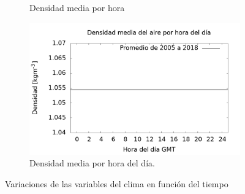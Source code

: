 \begin{figure}[H]
\begin{subfigure}[b]{0.49\textwidth}
			\caption{Densidad media por hora}
			\label{fig:densidad_hora}
		\end{subfigure}%
		\hspace{\fill}
        \begin{subfigure}[b]{0.49\textwidth}
			\centering	
			\includegraphics[width=\textwidth]{Graphs/clima/densidad_hod.png}
			\caption{Densidad media por hora del día.}
			\label{fig:area_auger}
        \end{subfigure}%
  \caption{Variaciones de las variables del clima en función del tiempo}
  \label{fig:clima_p_rho}
\end{figure}
